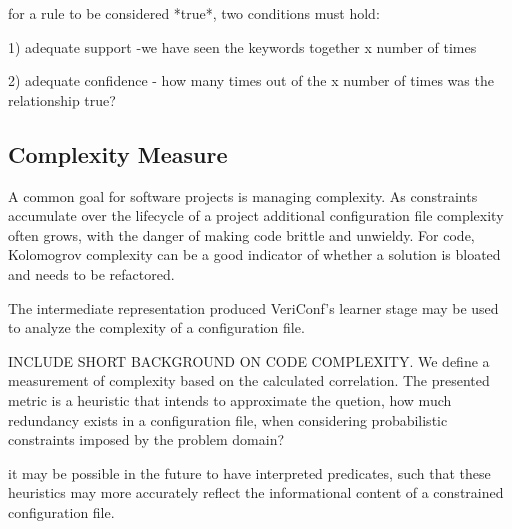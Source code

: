 for a rule to be considered *true*, two conditions must hold:

1) adequate support -we have seen the keywords together x number of times

2) adequate confidence - how many times out of the x number of times was the relationship true?

\fi

\iffalse
- Open Questions
> What is the difference between {\it important} rules and
  {\it rules we are more sure about}?

> Why doesn't everything just sum to zero?

\fi
\subsection{Complexity Measure}

A common goal for software projects is managing complexity. As
constraints accumulate over the lifecycle of a project additional
configuration file complexity often grows, with the danger of
making code brittle and unwieldy. For code, Kolomogrov complexity
can be a good indicator of whether a solution is bloated and 
needs to be refactored.

The intermediate representation produced VeriConf's learner stage
may be used to analyze the complexity of a configuration file.

INCLUDE SHORT BACKGROUND ON CODE COMPLEXITY. We define a measurement
of complexity based on the calculated correlation. The presented
metric is a heuristic that intends to approximate the quetion, 
how much redundancy exists in a configuration file, when considering
probabilistic constraints imposed by the problem domain?

it may be possible in the future to have interpreted predicates,
such that these heuristics may more accurately reflect the informational
content of a constrained configuration file.

\iffalse

Use the listing in figure 2 to put together an example of why the
naive implementation of complexity doesn't give as much of an idea
of what is going on as our heuristic.

\fi


